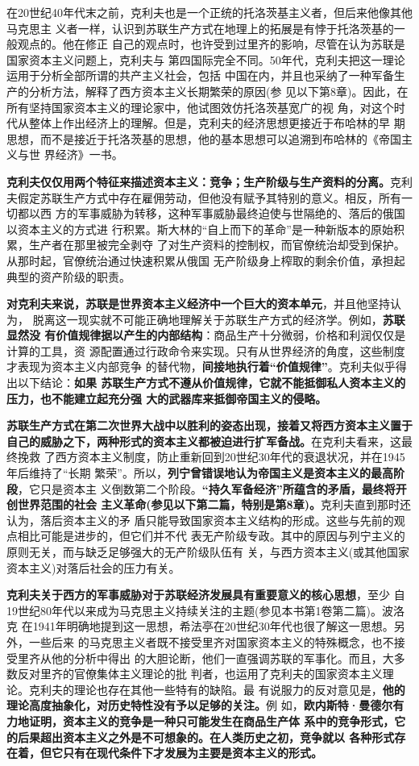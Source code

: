 在20世纪40年代末之前，克利夫也是一个正统的托洛茨基主义者，但后来他像其他马克思主
义者一样，认识到苏联生产方式在地理上的拓展是有悖于托洛茨基的一般观点的。他在修正
自己的观点时，也许受到过里齐的影响，尽管在认为苏联是国家资本主义问题上，克利夫与
第四国际完全不同。50年代，克利夫把这一理论运用于分析全部所谓的共产主义社会，包括
中国在内，并且也采纳了一种军备生产的分析方法，解释了西方资本主义长期繁荣的原因(参
见以下第8章)。因此，在所有坚持国家资本主义的理论家中，他试图效仿托洛茨基宽广的视
角，对这个时代从整体上作出经济上的理解。但是，克利夫的经济思想更接近于布哈林的早
期思想，而不是接近于托洛茨基的思想，他的基本思想可以追溯到布哈林的《帝国主义与世
界经济》一书。

\textbf{克利夫仅仅用两个特征来描述资本主义：竞争；生产阶级与生产资料的分离。}克利
夫假定苏联生产方式中存在雇佣劳动，但他没有赋予其特别的意义。相反，所有一切都以西
方的军事威胁为转移，这种军事威胁最终迫使与世隔绝的、落后的俄国以资本主义的方式进
行积累。斯大林的“自上而下的革命”是一种新版本的原始积累，生产者在那里被完全剥夺
了对生产资料的控制权，而官僚统治却受到保护。从那时起，官僚统治通过快速积累从俄国
无产阶级身上榨取的剩余价值，承担起典型的资产阶级的职责。

\textbf{对克利夫来说，苏联是世界资本主义经济中一个巨大的资本单元}，并且他坚持认为，
脱离这一现实就不可能正确地理解关于苏联生产方式的经济学。例如，\textbf{苏联显然没
  有价值规律据以产生的内部结构}：商品生产十分微弱，价格和利润仅仅是计算的工具，资
源配置通过行政命令来实现。只有从世界经济的角度，这些制度才表现为资本主义内部竞争
的替代物，\textbf{间接地执行着“价值规律”}。克利夫似乎得出以下结论：\textbf{如果
  苏联生产方式不遵从价值规律，它就不能抵御私人资本主义的压力，也不能建立起充分强
  大的武器库来抵御帝国主义的侵略。}

\textbf{苏联生产方式在第二次世界大战中以胜利的姿态出现，接着又将西方资本主义置于
  自己的威胁之下，两种形式的资本主义都被迫进行扩军备战。}在克利夫看来，这最终挽救
了西方资本主义制度，防止重新回到20世纪30年代的衰退状况，并在1945年后维持了“长期
繁荣”。所以，\textbf{列宁曾错误地认为帝国主义是资本主义的最高阶段}，它只是资本主
义倒数第二个阶段。\textbf{“持久军备经济”所蕴含的矛盾，最终将开创世界范围的社会
  主义革命(参见以下第二篇，特别是第8章)。}克利夫直到那时还认为，落后资本主义的矛
盾只能导致国家资本主义结构的形成。这些与先前的观点相比可能是进步的，但它们并不代
表无产阶级专政。其中的原因与列宁主义的原则无关，而与缺乏足够强大的无产阶级队伍有
关，与西方资本主义(或其他国家资本主义)对落后社会的压力有关。

\textbf{克利夫关于西方的军事威胁对于苏联经济发展具有重要意义的核心思想}，至少
自19世纪80年代以来成为马克思主义持续关注的主题(参见本书第1卷第二篇)。波洛克
在1941年明确地提到这一思想，希法亭在20世纪30年代也很了解这一思想。另外，一些后来
的马克思主义者既不接受里齐对国家资本主义的特殊概念，也不接受里齐从他的分析中得出
的大胆论断，他们一直强调苏联的军事化。而且，大多数反对里齐的官僚集体主义理论的批
判者，也运用了克利夫的国家资本主义理论。克利夫的理论也存在其他一些特有的缺陷。最
有说服力的反对意见是，\textbf{他的理论高度抽象化，对历史特性没有予以足够的关注。}例
如，\textbf{欧内斯特·曼德尔有力地证明，资本主义的竞争是一种只可能发生在商品生产体
  系中的竞争形式，它的后果超出资本主义之外是不可想象的。在人类历史之初，竞争就以
  各种形式存在着，但它只有在现代条件下才发展为主要是资本主义的形式。}

